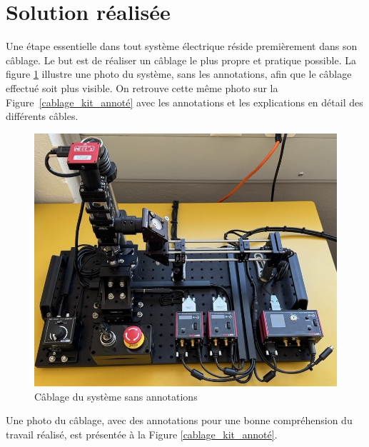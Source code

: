 \section{Solution réalisée}
Une étape essentielle dans tout système électrique réside premièrement dans son câblage. Le but est de réaliser un câblage le plus propre et pratique possible. La figure \ref{cablage_kit_pas_annoté} illustre une photo du système, sans les annotations, afin que le câblage effectué soit plus visible. On retrouve cette même photo sur la Figure~\ref{cablage_kit_annoté} avec les annotations et les explications en détail des différents câbles.
\begin{figure}[H]
    \begin{center}
        \includegraphics[width=\textwidth]{assets/figures/Cablage_du_kit/Cablage_vierge.jpeg}
    \end{center}
    \caption{Câblage du système sans annotations}
    \label{cablage_kit_pas_annoté}
\end{figure}

\newpage
Une photo du câblage, avec des annotations pour une bonne compréhension du travail réalisé, est présentée à la Figure \ref{cablage_kit_annoté}.

